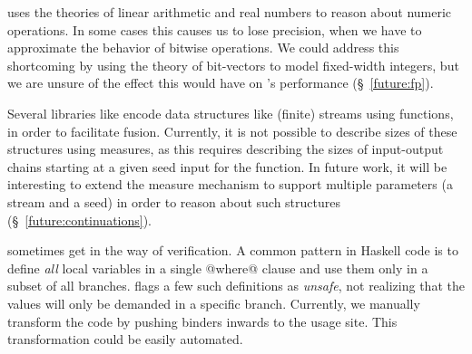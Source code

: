 \toolname uses the theories of linear arithmetic and
real numbers to reason about numeric operations. In some
cases this causes us to lose precision, \eg when we have to
approximate the behavior of bitwise operations. We could
address this shortcoming by using the theory of bit-vectors
to model fixed-width integers, but we are unsure of the
effect this would have on \toolname's performance (\S~\ref{future:fp}).

\begin{comment}
\mypara{Higher-order functions} 
must sometimes be \emph{specialized} because the 
original type is not precise enough. 
%
For example, the \texttt{concat} function that
concatenates a list of input @ByteString@s %
pre-allocates the output region by computing the 
total size of the input.
%
\begin{code}
  len = sum . map length $ xs
\end{code}
Unfortunately, the type for @map@ is not sufficiently
precise to conclude that the value @len@ equals 
@bLens xs@, se we must manually specialize
the above into a single recursive traversal that 
computes the lengths.
%
Rather than complicating the type system with a very
general higher-order type for @map@ we suspect the 
best way forward will be to allow the user to specify
inlining in a clean fashion.
\end{comment}

 Several libraries like \lbtext
encode data structures like (finite) streams using functions,
in order to facilitate fusion. Currently, it is not possible
to describe sizes of these structures using measures, as this
requires describing the sizes of input-output chains starting
at a given seed input for the function. In future work, it will 
be interesting to extend the measure mechanism to support 
multiple parameters (\eg a stream and a seed) in order to reason
about such structures (\S~\ref{future:continuations}). 

 sometimes get in the way of verification. 
A common pattern in Haskell code is to define \emph{all} 
local variables in a single @where@ clause and use them 
only in a subset of all branches. 
%
\toolname flags a few such definitions as \emph{unsafe},
not realizing that the values will only be demanded in a
specific branch. 
%
Currently, we manually transform the code by pushing 
binders inwards to the usage site. %
This transformation could be easily automated.

